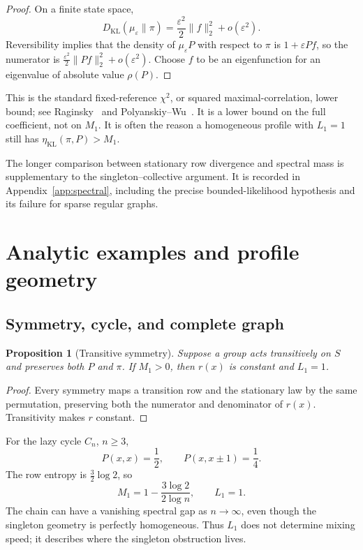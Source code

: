 \documentclass[11pt]{article}
\newtheorem{proposition}[theorem]{Proposition}
\newcommand{\KL}{D_{\mathrm{KL}}}
\newcommand{\etaStat}{\eta_{\mathrm{KL}}(\pi,P)}
\newcommand{\Mone}{M_1}
\newcommand{\Lone}{L_1}
\begin{document}
\begin{proof}
On a finite state space,
\[
  \KL(\mu_\varepsilon\|\pi)
  =\frac{\varepsilon^2}{2}\|f\|_2^2+o(\varepsilon^2).
\]
Reversibility implies that the density of \(\mu_\varepsilon P\) with
respect to \(\pi\) is \(1+\varepsilon Pf\), so the numerator is
\(\frac{\varepsilon^2}{2}\|Pf\|_2^2+o(\varepsilon^2)\).
Choose \(f\) to be an eigenfunction for an eigenvalue of absolute value
\(\rho(P)\).
\end{proof}

This is the standard fixed-reference \(\chi^2\), or squared
maximal-correlation, lower bound; see
Raginsky~\cite[Theorem~3.3]{Raginsky2016} and
Polyanskiy--Wu~\cite{PolyanskiyWu2017}.  It is a lower bound on the full
coefficient, not on \(\Mone\).  It is
often the reason a homogeneous profile with \(\Lone=1\) still has
\(\etaStat>\Mone\).

The longer comparison between stationary row divergence and spectral mass
is supplementary to the singleton--collective argument.  It is recorded in
Appendix~\ref{app:spectral}, including the precise bounded-likelihood
hypothesis and its failure for sparse regular graphs.


\section{Analytic examples and profile geometry}
\label{sec:examples}

\subsection{Symmetry, cycle, and complete graph}

\begin{proposition}[Transitive symmetry]
\label{prop:transitive}
Suppose a group acts transitively on \(S\) and preserves both \(P\) and
\(\pi\).  If \(\Mone>0\), then \(r(x)\) is constant and \(\Lone=1\).
\end{proposition}

\begin{proof}
Every symmetry maps a transition row and the stationary law by the same
permutation, preserving both the numerator and denominator of \(r(x)\).
Transitivity makes \(r\) constant.
\end{proof}

For the lazy cycle \(C_n\), \(n\ge3\),
\[
  P(x,x)=\frac12,\qquad P(x,x\pm1)=\frac14.
\]
The row entropy is \(\frac32\log2\), so
\[
  \Mone=1-\frac{3\log2}{2\log n},
  \qquad
  \Lone=1.
\]
The chain can have a vanishing spectral gap as \(n\to\infty\), even though
the singleton geometry is perfectly homogeneous.  Thus \(\Lone\) does not
determine mixing speed; it describes where the singleton obstruction lives.
\end{document}
